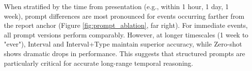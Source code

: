 When stratified by the time from presentation (e.g., within 1 hour, 1 day, 1 week), prompt differences are most pronounced for events occurring farther from the report anchor (Figure \ref{fig:prompt_ablation}, far right). For immediate events, all prompt versions perform comparably. However, at longer timescales (1 week to "ever"), Interval and Interval+Type maintain superior accuracy, while Zero-shot shows dramatic drops in performance. This suggests that structured prompts are particularly critical for accurate long-range temporal reasoning.






